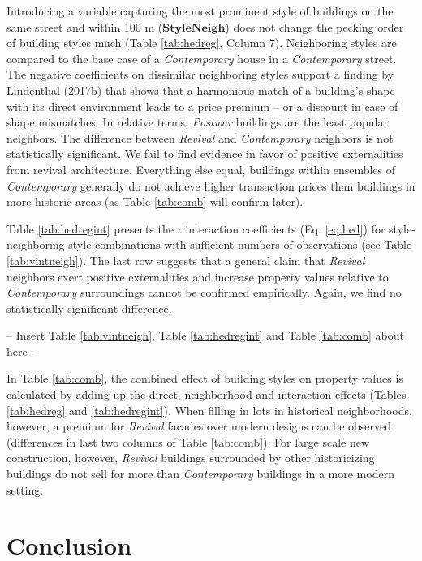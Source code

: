 \documentclass[]{article}
\begin{document}
Introducing a variable capturing the most prominent style of buildings
on the same street and within 100 m (\(\mathbf{StyleNeigh}\)) does not
change the pecking order of building styles much (Table
\ref{tab:hedreg}, Column 7). Neighboring styles are compared to the base
case of a \emph{Contemporary} house in a \emph{Contemporary} street. The
negative coefficients on dissimilar neighboring styles support a finding
by Lindenthal (2017b) that shows that a harmonious match of a building's
shape with its direct environment leads to a price premium -- or a
discount in case of shape mismatches. In relative terms, \emph{Postwar}
buildings are the least popular neighbors. The difference between
\emph{Revival} and \emph{Contemporary} neighbors is not statistically
significant. We fail to find evidence in favor of positive externalities
from revival architecture. Everything else equal, buildings within
ensembles of \emph{Contemporary} generally do not achieve higher
transaction prices than buildings in more historic areas (as Table
\ref{tab:comb} will confirm later).

Table \ref{tab:hedregint} presents the \(\iota\) interaction
coefficients (Eq. \ref{eq:hed}) for style-neighboring style combinations
with sufficient numbers of observations (see Table \ref{tab:vintneigh}).
The last row suggests that a general claim that \emph{Revival} neighbors
exert positive externalities and increase property values relative to
\emph{Contemporary} surroundings cannot be confirmed empirically. Again,
we find no statistically significant difference.

\begin{center}
  -- Insert  Table \ref{tab:vintneigh}, Table \ref{tab:hedregint} and Table \ref{tab:comb} about here --
\end{center}

In Table \ref{tab:comb}, the combined effect of building styles on
property values is calculated by adding up the direct, neighborhood and
interaction effects (Tables \ref{tab:hedreg} and \ref{tab:hedregint}).
When filling in lots in historical neighborhoods, however, a premium for
\emph{Revival} facades over modern designs can be observed (differences
in last two columns of Table \ref{tab:comb}). For large scale new
construction, however, \emph{Revival} buildings surrounded by other
historicizing buildings do not sell for more than \emph{Contemporary}
buildings in a more modern setting.

\hypertarget{conclusion}{%
\section{Conclusion}\label{conclusion}}
\end{document}

